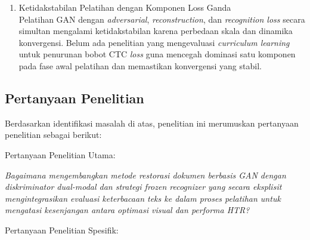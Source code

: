 \begin{enumerate}[leftmargin=1.5em, labelsep=0.5em, itemindent=0pt, noitemsep, topsep=0pt]
      \item Ketidakstabilan Pelatihan dengan Komponen Loss Ganda \\
            Pelatihan GAN dengan \textit{adversarial}, \textit{reconstruction}, dan \textit{recognition loss} secara simultan mengalami ketidakstabilan karena perbedaan skala dan dinamika konvergensi. Belum ada penelitian yang mengevaluasi \textit{curriculum learning} untuk penurunan bobot CTC \textit{loss} guna mencegah dominasi satu komponen pada fase awal pelatihan dan memastikan konvergensi yang stabil.

\end{enumerate}


\subsection{Pertanyaan Penelitian}
\label{subsec:pertanyaan-penelitian}

Berdasarkan identifikasi masalah di atas, penelitian ini merumuskan pertanyaan penelitian sebagai berikut:


Pertanyaan Penelitian Utama:

\textit{Bagaimana mengembangkan metode restorasi dokumen berbasis GAN dengan diskriminator dual-modal dan strategi \textit{frozen recognizer} yang secara eksplisit mengintegrasikan evaluasi keterbacaan teks ke dalam proses pelatihan untuk mengatasi kesenjangan antara optimasi visual dan performa HTR?}


Pertanyaan Penelitian Spesifik:

